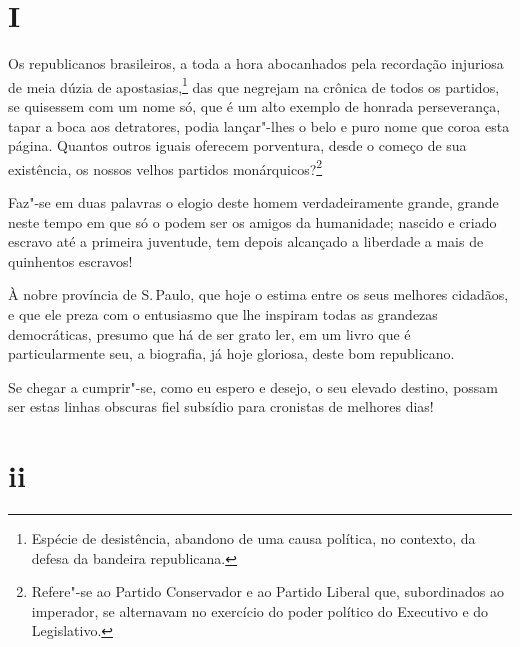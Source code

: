 \section*{I}

\noindent{}Os republicanos brasileiros, a toda a hora abocanhados pela recordação
injuriosa de meia dúzia de apostasias,\footnote{Espécie de desistência,
  abandono de uma causa política, no contexto, da defesa da bandeira
  republicana.} das que negrejam na crônica de todos os partidos, se
quisessem com um nome só, que é um alto exemplo de honrada perseverança,
tapar a boca aos detratores, podia lançar"-lhes o belo e puro nome que
coroa esta página. Quantos outros iguais oferecem porventura, desde o
começo de sua existência, os nossos velhos partidos
monárquicos?\footnote{Refere"-se ao Partido Conservador e ao Partido
  Liberal que, subordinados ao imperador, se alternavam no exercício do
  poder político do Executivo e do Legislativo.}

Faz"-se em duas palavras o elogio deste homem verdadeiramente grande,
grande neste tempo em que só o podem ser os amigos da humanidade;
nascido e criado escravo até a primeira juventude, tem depois alcançado
a liberdade a mais de quinhentos escravos!

À nobre província de S.\,Paulo, que hoje o estima entre os seus melhores
cidadãos, e que ele preza com o entusiasmo que lhe inspiram todas as
grandezas democráticas, presumo que há de ser grato ler, em um livro que
é particularmente seu, a biografia, já hoje gloriosa, deste bom
republicano.

Se chegar a cumprir"-se, como eu espero e desejo, o seu elevado destino,
possam ser estas linhas obscuras fiel subsídio para cronistas de
melhores dias!

\section*{ii}

